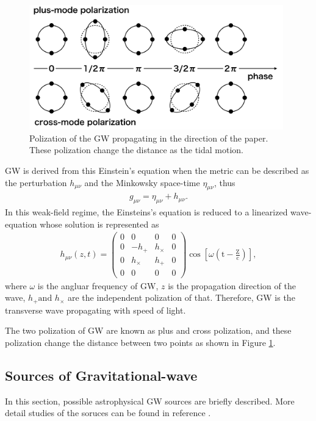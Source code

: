 \begin{figure}[t]
  \begin{center}   
    \includegraphics[width=11.0cm]{./img_chap1/img131.png}
    \caption[Polization of the GW]{Polization of the GW propagating in the direction of the paper. These polization change the distance as the tidal motion.
}\label{img:img131}
  \end{center}
\end{figure}

GW is derived from this Einstein's equation when the metric can be described as the perturbation $h_{\mu\nu}$ and the Minkowsky space-time $\eta_{\mu\nu}$, thus
\begin{eqnarray}
  g_{\mu \nu}=\eta_{\mu \nu}+h_{\mu \nu}.
\end{eqnarray}
In this weak-field regime, the Einsteins's equation is reduced to a linearized wave-equation whose solution is represented as
\begin{eqnarray}
  h_{\mu \nu}(z, t)=\left(\begin{array}{cccc}{0} & {0} & {0} & {0} \\ {0} & {-h_{+}} & {h_{\times}} & {0} \\ {0} & {h_{\times}} & {h_{+}} & {0} \\ {0} & {0} & {0} & {0}\end{array}\right) \cos \left[\omega\left(\mathrm{t}-\frac{\mathrm{Z}}{\mathrm{c}}\right)\right], \label{eq:eq130}
\end{eqnarray}
where $\omega$ is the angluar frequency of GW, $z$ is the propagation direction of the wave, $h_{+} \text {and } h_{\times}$ are the independent polization of that. Therefore, GW is the transverse wave propagating with speed of light.

The two polization of GW are known as plus and cross polization, and these polization change the distance between two points as shown in Figure \ref{img:img131}. 

\subsection{Sources of Gravitational-wave}
In this section, possible astrophysical GW sources are briefly described. More detail studies of the soruces can be found in reference \cite{cutler2002overview}.

